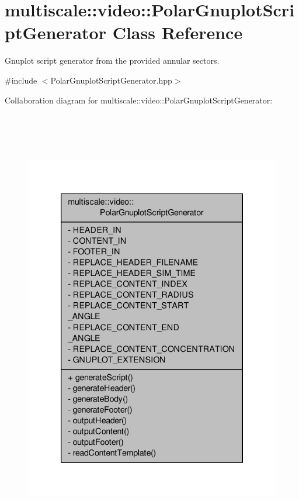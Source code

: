 \hypertarget{classmultiscale_1_1video_1_1PolarGnuplotScriptGenerator}{\section{multiscale\-:\-:video\-:\-:\-Polar\-Gnuplot\-Script\-Generator \-Class \-Reference}
\label{classmultiscale_1_1video_1_1PolarGnuplotScriptGenerator}
}


\-Gnuplot script generator from the provided annular sectors.  




{\ttfamily \#include $<$\-Polar\-Gnuplot\-Script\-Generator.\-hpp$>$}



\-Collaboration diagram for multiscale\-:\-:video\-:\-:\-Polar\-Gnuplot\-Script\-Generator\-:
\nopagebreak
\begin{figure}[H]
\begin{center}
\leavevmode
\includegraphics[height=550pt]{classmultiscale_1_1video_1_1PolarGnuplotScriptGenerator__coll__graph}
\end{center}
\end{figure}
